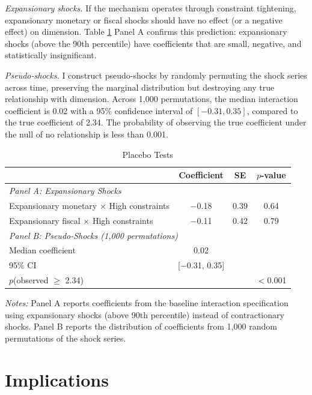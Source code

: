 \documentclass[12pt,letterpaper]{article}
\theoremstyle{plain}
\theoremstyle{definition}
\begin{document}
\textit{Expansionary shocks.} If the mechanism operates through constraint tightening, expansionary monetary or fiscal shocks should have no effect (or a negative effect) on dimension. Table \ref{tab:placebo} Panel A confirms this prediction: expansionary shocks (above the 90th percentile) have coefficients that are small, negative, and statistically insignificant.

\textit{Pseudo-shocks.} I construct pseudo-shocks by randomly permuting the shock series across time, preserving the marginal distribution but destroying any true relationship with dimension. Across 1,000 permutations, the median interaction coefficient is 0.02 with a 95\% confidence interval of $[-0.31, 0.35]$, compared to the true coefficient of 2.34. The probability of observing the true coefficient under the null of no relationship is less than 0.001.

\begin{table}[htbp]
\centering
\caption{Placebo Tests}
\label{tab:placebo}
\begin{tabular}{lccc}
\toprule
& Coefficient & SE & $p$-value \\
\midrule
\multicolumn{4}{l}{\textit{Panel A: Expansionary Shocks}} \\
Expansionary monetary $\times$ High constraints & $-$0.18 & 0.39 & 0.64 \\
Expansionary fiscal $\times$ High constraints & $-$0.11 & 0.42 & 0.79 \\
\midrule
\multicolumn{4}{l}{\textit{Panel B: Pseudo-Shocks (1,000 permutations)}} \\
Median coefficient & 0.02 & & \\
95\% CI & [$-$0.31, 0.35] & & \\
$p$(observed $\geq$ 2.34) & & & $<$0.001 \\
\bottomrule
\end{tabular}

\vspace{0.5em}
\footnotesize
\textit{Notes:} Panel A reports coefficients from the baseline interaction specification using expansionary shocks (above 90th percentile) instead of contractionary shocks. Panel B reports the distribution of coefficients from 1,000 random permutations of the shock series.
\end{table}


\section{Implications}\label{sec:implications}
\end{document}
